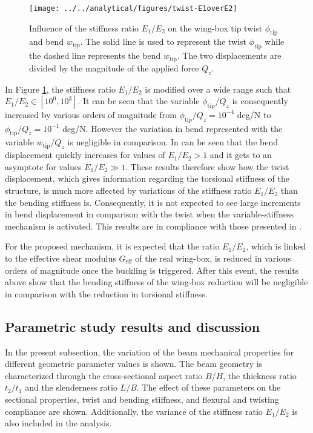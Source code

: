     \begin{figure}[!htpb] %
      \centering
      \texttt{[image: ../../analytical/figures/twist-E1overE2]}
      \caption[Influence of the stiffness ratio on the wing-box tip twist and bend]{Influence of the stiffness ratio $E_1/E_2$ on the wing-box tip twist $\phi_{\mathrm{tip}}$ and bend $w_{\mathrm{tip}}$. The solid line is used to represent the twist $\phi_{\mathrm{tip}}$ while the dashed line represents the bend $w_{\mathrm{tip}}$. The two displacements are divided by the magnitude of the applied force $Q_z$.}\label{fig:twist-E1overE2}
    \end{figure}

    In Figure \ref{fig:twist-E1overE2}, the stiffness ratio $E_1/E_2$ is modified over a wide range such that $E_1/E_2 \in [10^{0}, 10^{3}]$. It can be seen that the variable $\phi_{\mathrm{tip}}/Q_z$ is consequently increased by various orders of magnitude from $\phi_{\mathrm{tip}}/Q_z = 10^{-4}$ deg/N to $\phi_{\mathrm{tip}}/Q_z = 10^{-1}$ deg/N. However the variation in bend represented with the variable $w_{\mathrm{tip}}/Q_z$ is negligible in comparison. In can be seen that the bend displacement quickly increases for values of $E_1/E_2 > 1$ and it gets to an asymptote for values $E_1/E_2 \gg 1$. These results therefore show how the twist displacement, which gives information regarding the torsional stiffness of the structure, is much more affected by variations of the stiffness ratio $E_1/E_2$ than the bending stiffness is. Consequently, it is not expected to see large increments in bend displacement in comparison with the twist when the variable-stiffness mechanism is activated. This results are in compliance with those presented in \cite{Raither2013a}.

    For the proposed mechanism, it is expected that the ratio $E_1/E_2$, which is linked to the effective shear modulus $G_{\mathrm{eff}}$ of the real wing-box, is reduced in various orders of magnitude once the buckling is triggered. After this event, the results above show that the bending stiffness of the wing-box reduction will be negligible in comparison with the reduction in torsional stiffness. 

  \subsection{Parametric study results and discussion} \label{subsec:results_parametricStudy}

    In the present subsection, the variation of the beam mechanical properties for different geometric parameter values is shown. The beam geometry is characterized through the cross-sectional aspect ratio $B/H$, the thickness ratio $t_2/t_1$ and the slenderness ratio $L/B$. The effect of these parameters on the sectional properties, twist and bending stiffness, and flexural and twisting compliance are shown. Additionally, the variance of the stiffness ratio $E_1/E_2$ is also included in the analysis.

